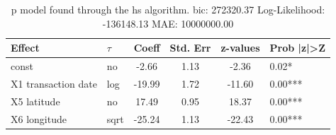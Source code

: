 \begin{table}
	\caption{p model found through the hs algorithm. bic: 272320.37 Log-Likelihood: -136148.13 MAE: 10000000.00}
	\begin{center}
		\begin{tabular}{|l|l|c|c|c|l|}
			\hline
			Effect & $\tau$ & Coeff & Std. Err & z-values & Prob |z|>Z \\
			\hline
			const & no & -2.66 & 1.13 & -2.36 & 0.02* \\
			\hline
			X1 transaction date & log & -19.99 & 1.72 & -11.60 & 0.00*** \\
			\hline
			X5 latitude & no & 17.49 & 0.95 & 18.37 & 0.00*** \\
			\hline
			X6 longitude & sqrt & -25.24 & 1.13 & -22.43 & 0.00*** \\
			\hline
		\end{tabular}
	\end{center}
\end{table}